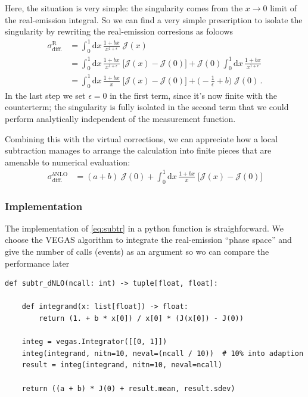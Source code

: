 \documentclass[11pt]{article}
\begin{document}
Here, the situation is very simple: the singularity comes from the \(x\to0\) limit of the real-emission integral.
So we can find a very simple prescription to isolate the singularity by rewriting the real-emission corresions as foloows
\begin{align}
  \sigma^\mathrm{R}_\mathrm{diff.}
  &=
  \int_0^1\mathrm{d}x\,\frac{1+bx}{x^{1+\epsilon}}
  \;\mathcal{J}(x)
  \nonumber\\&=
  \int_0^1\mathrm{d}x\,\frac{1+bx}{x^{1+\epsilon}}
  \;\Big[\mathcal{J}(x) - \mathcal{J}(0)\Bigr]
  + \mathcal{J}(0)
  \int_0^1\mathrm{d}x\,\frac{1+bx}{x^{1+\epsilon}}
  \nonumber\\&=
  \int_0^1\mathrm{d}x\,\frac{1+bx}{x}
  \;\Big[\mathcal{J}(x) - \mathcal{J}(0)\bigr]
  +\biggl( -\frac{1}{\epsilon} + b \biggr) \;\mathcal{J}(0)
  \,.
\end{align}
In the last step we set \(\epsilon=0\) in the first term, since it's now finite with the counterterm; the singularity is fully isolated in the second term that we could perform analytically independent of the measurement function.

Combining this with the virtual corrections, we can appreciate how a local subtraction manages to arrange the calculation into finite pieces that are amenable to numerical evaluation:
\begin{align}
\label{eq:subtr}
  \sigma^\mathrm{\delta NLO}_\mathrm{diff.}
  &=
  (a + b) \;\mathcal{J}(0)
  +\int_0^1\mathrm{d}x\,\frac{1+bx}{x}
  \;\Big[\mathcal{J}(x) - \mathcal{J}(0)\Bigr]
\end{align}

\subsubsection{Implementation}
\label{sec:orgbf4abc5}
The implementation of \eqref{eq:subtr} in a python function is straighforward.
We choose the VEGAS algorithm to integrate the real-emission ``phase space'' and give the number of calls (events) as an argument so wo can compare the performance later
\begin{verbatim}
def subtr_dNLO(ncall: int) -> tuple[float, float]:

    def integrand(x: list[float]) -> float:
        return (1. + b * x[0]) / x[0] * (J(x[0]) - J(0))

    integ = vegas.Integrator([[0, 1]])
    integ(integrand, nitn=10, neval=(ncall / 10))  # 10% into adaption
    result = integ(integrand, nitn=10, neval=ncall)

    return ((a + b) * J(0) + result.mean, result.sdev)
\end{verbatim}
\end{document}
